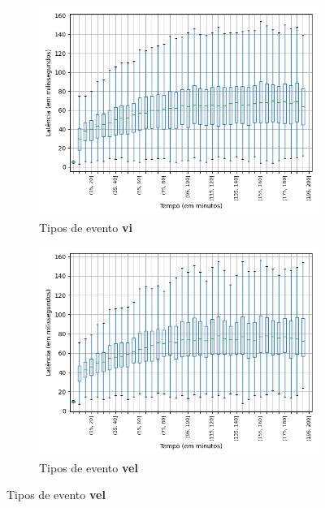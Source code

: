 \begin{figure}[p]
\begin{subfigure}{.5\textwidth}
\centering
\includegraphics[width=\textwidth]{figuras/graphics/boxplot_7-dez-is_vi.png}
\caption{Tipos de evento \textbf{vi}}
\label{fig:BoxPlot_vi_IS_7-dez-is-r}
\end{subfigure}%
\centering
\begin{subfigure}{.5\textwidth}
\centering
\includegraphics[width=\textwidth]{figuras/graphics/boxplot_7-dez-is_vel.png}
\caption{Tipos de evento \textbf{vel}}
\label{fig:BoxPlot_vel_IS_7-dez-is-r}
\end{subfigure}%


\end{figure}
